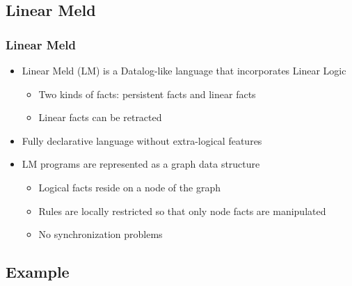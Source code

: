 \documentclass{beamer}
\begin{document}
\subsection{Linear Meld}

\frame
{
   \frametitle{Linear Meld}
   \begin{itemize}
      \item Linear Meld (LM) is a Datalog-like language that incorporates Linear Logic
      \begin{itemize}
         \item Two kinds of facts: persistent facts and linear facts
         \item Linear facts can be retracted
      \end{itemize}
      \item Fully declarative language without extra-logical features
      \item LM programs are represented as a graph data structure
      \begin{itemize}
         \item Logical facts reside on a node of the graph
         \item Rules are locally restricted so that only node facts are manipulated
         \item No synchronization problems
      \end{itemize}
   \end{itemize}
}

\subsection{Example}
\end{document}
